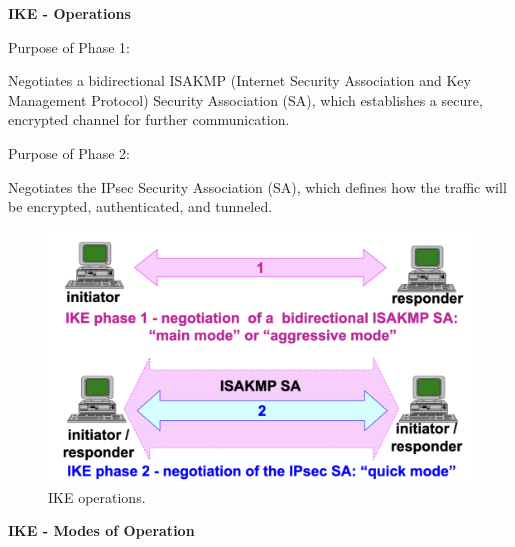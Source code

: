 \hfill

\textbf{IKE - Operations}

\vspace{0.2cm}

Purpose of Phase 1:

\begin{center}
    Negotiates a bidirectional ISAKMP (Internet Security Association and Key Management Protocol) Security Association (SA), which establishes a secure, encrypted channel for further communication.
\end{center}
Purpose of Phase 2:
\begin{center}
    Negotiates the IPsec Security Association (SA), which defines how the traffic will be encrypted, authenticated, and tunneled.
\end{center}

\begin{figure}[H]
    \centering
  \includegraphics[width=0.5\linewidth]{Images/NetSec/ike_operations.png}
  \caption{IKE operations.}
\end{figure}


\clearpage
\textbf{IKE - Modes of Operation}
\vspace{0.2cm}


